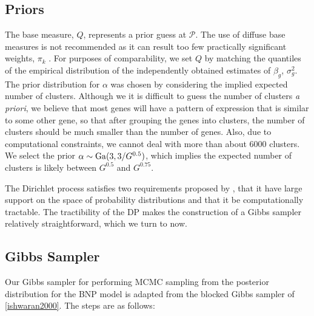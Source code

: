 
\subsection{Priors}
The base measure, $Q$, represents a prior guess at $\mathcal{P}$. The use of diffuse base measures is not recommended as it can result too few practically significant weights, $\pi_k$ \citep[p.554]{gelman-book}. For purposes of comparability, we set $Q$ by matching the quantiles of the empirical distribution of the independently obtained estimates of $\beta_g$, $\sigma_g^2$. The prior distribution for $\alpha$ was chosen by considering the implied expected number of clusters. Although we it is difficult to guess the number of clusters \textit{a priori}, we believe that most genes will have a pattern of expression that is similar to some other gene, so that after grouping the genes into clusters, the number of clusters should be much smaller than the number of genes. Also, due to computational constraints, we cannot deal with more than about 6000 clusters. We select the prior $\alpha \sim \operatorname{Ga}(3,3/G^{0.5})$, which implies the expected number of clusters is likely between $G^{0.5}$ and $G^{0.75}$.

The Dirichlet process satisfies two requirements proposed by \citet{ferguson}, that it have large support on the space of probability distributions and that it be computationally tractable. The tractibility of the DP makes the construction of a Gibbs sampler relatively straightforward, which we turn to now.

\subsection{Gibbs Sampler}
Our Gibbs sampler for performing MCMC sampling from the posterior distribution for the BNP model is adapted from the blocked Gibbs sampler of \ref{ishwaran2000}. The steps are as follows:

